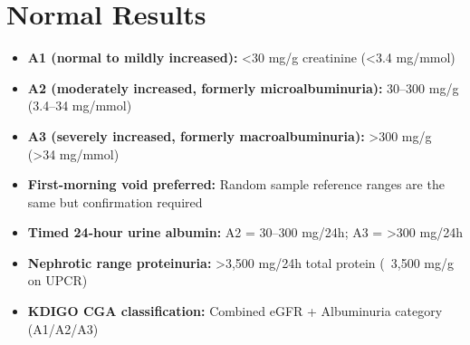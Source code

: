 \section*{Normal Results}
\begin{itemize}
  \item \textbf{A1 (normal to mildly increased):} <30 mg/g creatinine (<3.4 mg/mmol)
  \item \textbf{A2 (moderately increased, formerly microalbuminuria):} 30--300 mg/g (3.4--34 mg/mmol)
  \item \textbf{A3 (severely increased, formerly macroalbuminuria):} >300 mg/g (>34 mg/mmol)
  \item \textbf{First-morning void preferred:} Random sample reference ranges are the same but confirmation required
  \item \textbf{Timed 24-hour urine albumin:} A2 = 30--300 mg/24h; A3 = >300 mg/24h
  \item \textbf{Nephrotic range proteinuria:} >3,500 mg/24h total protein (~3,500 mg/g on UPCR)
  \item \textbf{KDIGO CGA classification:} Combined eGFR + Albuminuria category (A1/A2/A3)
\end{itemize}

